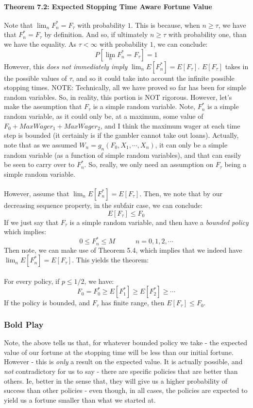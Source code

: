 \documentclass[12pt,a4paper]{article}
\newcommand{\1}[1]{\mathbbm{1}\left\{ #1 \right\}}
\begin{document}
\paragraph{Theorem 7.2: Expected Stopping Time Aware Fortune Value} Note that $\lim_n F_n^* = F_\tau$ with probability $1$. This is because, when $n \geq \tau$, we have that $F_n^* = F_\tau$ by definition. And so, if ultimately $n \geq \tau$ with probability one, than we have the equality. As $\tau < \infty$ with probability $1$, we can conclude:
$$
	P\left[\lim_n F_n^* = F_\tau\right] = 1
$$
However, this \textit{does not immediately imply} $\lim_n E[F_n^*] = E[F_\tau]$. $E[F_\tau]$ takes in the possible values of $\tau$, and so it could take into account the infinite possible stopping times. NOTE: Technically, all we have proved so far has been for simple random variables. So, in reality, this portion is NOT rigorous. However, let's make the assumption that $F_\tau$ is a simple random variable. Note, $F_n^*$ is a simple random variable, as it could only be, at a maximum, some value of $F_0 + MaxWager_1 + MaxWager_2$, and I think the maximum wager at each time step is bounded (it certainly is if the gambler cannot take out loans). Actually, note that as we assumed $W_n = g_n(F_0, X_1, \cdots, X_n)$, it can only be a simple random variable (as a function of simple random variables), and that can easily be seen to carry over to $F_n^*$. So, really, we only need an assumption on $F_\tau$ being a simple random variable.
\\\\
However, assume that $\lim_n E[F_n^*] = E[F_\tau]$. Then, we note that by our decreasing sequence property, in the subfair case, we can conclude:
$$
	E[F_\tau] \leq F_0
$$
If we just say that $F_\tau$ is a simple random variable, and then have a \textit{bounded policy} which implies:
$$
	0 \leq F_n^* \leq M \quad\quad\quad n = 0, 1, 2, \cdots
$$
Then note, we can make use of Theorem 5.4, which implies that we indeed have $\lim_n E[F_n^*] = E[F_\tau]$. This yields the theorem:
\\\\
For every policy, if $p \leq 1/2$, we have:
$$
	F_0 = F_0^* \geq E[F_1^*] \geq E[F_2^*] \geq \cdots
$$
If the policy is bounded, and $F_\tau$ has finite range, then $E[F_\tau] \leq F_0$. 

\subsubsection{Bold Play}
Note, the above tells us that, for whatever bounded policy we take - the expected value of our fortune at the stopping time will be less than our initial fortune. However - this is \textit{only} a result on the expected value. It is actually possible, and \textit{not} contradictory for us to say - there are specific policies that are better than others. Ie, better in the sense that, they will give us a higher probability of success than other policies - even though, in all cases, the policies are expected to yield us a fortune smaller than what we started at.
\end{document}
